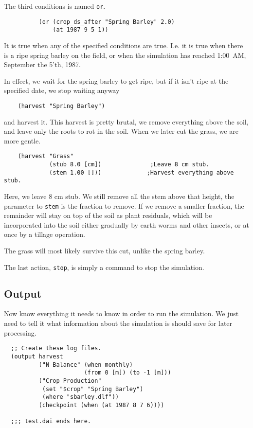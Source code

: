 \documentclass[a4paper,11pt]{article}
\begin{document}
The third conditions is named \texttt{or}.

\begin{verbatim}
          (or (crop_ds_after "Spring Barley" 2.0)
              (at 1987 9 5 1))
\end{verbatim}

It is true when any of the specified conditions are true.  I.e. it is
true when there is a ripe spring barley on the field, or when the
simulation has reached 1:00~AM, September the 5'th, 1987.

In effect, we wait for the spring barley to get ripe, but if it isn't
ripe at the specified date, we stop waiting anyway

\begin{verbatim}
    (harvest "Spring Barley")
\end{verbatim}

and harvest it.  This harvest is pretty brutal, we remove everything
above the soil, and leave only the roots to rot in the soil.  When we
later cut the grass, we are more gentle.

\begin{verbatim}
    (harvest "Grass"
             (stub 8.0 [cm])              ;Leave 8 cm stub.
             (stem 1.00 []))             ;Harvest everything above stub.
\end{verbatim}

Here, we leave 8 cm stub.  We still remove all the stem above that
height, the parameter to \texttt{stem} is the fraction to remove.  If
we remove a smaller fraction, the remainder will stay on top of the
soil as plant residuals, which will be incorporated into the soil
either gradually by earth worms and other insects, or at once by a
tillage operation.

The grass will most likely survive this cut, unlike the spring barley.

The last action, \texttt{stop}, is simply a command to stop the
simulation.

\subsection{Output}

Now \daisy{} know everything it needs to know in order to run the
simulation.  We just need to tell it what information about the
simulation is should save for later processing.

\begin{verbatim}
  ;; Create these log files.
  (output harvest
          ("N Balance" (when monthly)
                       (from 0 [m]) (to -1 [m]))
          ("Crop Production"
           (set "$crop" "Spring Barley")
           (where "sbarley.dlf"))
          (checkpoint (when (at 1987 8 7 6))))

  ;;; test.dai ends here.
\end{verbatim}
\end{document}

